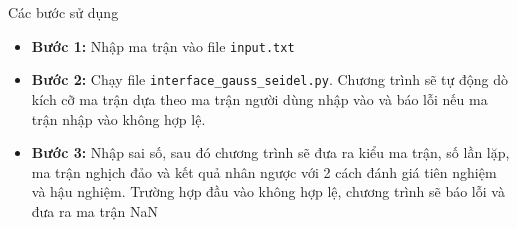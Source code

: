 \documentclass[12pt,a4paper]{article}
\begin{document}
    \par Các bước sử dụng
    \begin{itemize}
        \item \textbf{Bước 1:} Nhập ma trận vào file \texttt{input.txt}
        \item \textbf{Bước 2:} Chạy file \texttt{interface\_gauss\_seidel.py}. Chương trình sẽ tự động dò kích cỡ ma trận dựa theo ma trận người dùng nhập vào và báo lỗi nếu ma trận nhập vào không hợp lệ.
        \item \textbf{Bước 3:} Nhập sai số, sau đó chương trình sẽ đưa ra kiểu ma trận, số lần lặp, ma trận nghịch đảo và kết quả nhân ngược với 2 cách đánh giá tiên nghiệm và hậu nghiệm. Trường hợp đầu vào không hợp lệ, chương trình sẽ báo lỗi và đưa ra ma trận NaN
    \end{itemize}


    
\end{document}
